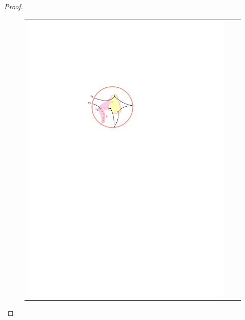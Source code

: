 \documentclass{patmorin}
\theoremstyle{plain}
\theoremstyle{definition}
\DeclareMathOperator{\dist}{dist}
\renewcommand{\ge}{\geqslant}
\renewcommand{\le}{\leqslant}
\begin{document}
\begin{proof}


	\begin{figure}
		\begin{center}
			\begin{tabular}{c@{}c@{}c}
				\includegraphics{figs/zoomba-1} &

\end{tabular}
\end{center}
\end{figure}
\end{proof}
\end{document}
